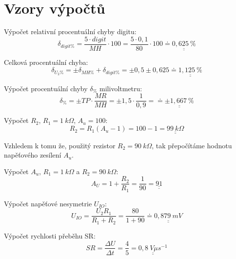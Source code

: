\section*{Vzory výpočtů}
  
  \indent\indent Výpočet relativní procentuální chyby digitu:
  \begin{equation}
    \delta _{digit\%} = \dfrac{5 \cdot digit}{MH} \cdot 100 = \dfrac{5 \cdot 0,1}{80} \cdot 100 \doteq \underline{\underline{0,625~\%}}
    \nonumber
  \end{equation}
  
  Celková procentuální chyba:
  \begin{equation}
    \delta_{U_2\%} = \pm\delta_{MH\%} + \delta_{digit\%} = \pm 0,5 \pm 0,625 \doteq \underline{\underline{1,125~\%}}
    \nonumber
  \end{equation} 
  
  Výpočet procentuální chyby $\delta_\%$ milivoltmetru:
  \begin{equation}
  	\delta _\% = \pm TP \cdot \dfrac{MR}{MH} = \pm 1,5 \cdot \dfrac{1}{0,9} = \doteq \underline{\underline{\pm 1,667~\%}}
    \nonumber
  \end{equation}
  
  Výpočet $R_2$, $R_1 = 1~k\Omega$, $A_u = 100$:
  \begin{equation}
  	R_2 = R_1(A_u - 1) = 100 - 1 = \underline{\underline{99~k\Omega}}
    \nonumber
  \end{equation}
  
  Vzhledem k tomu že, použitý rezistor $R_2 = 90~k\Omega$, tak přepočítáme hodnotu napěťového zesílení $A_u$.
  
  Výpočet $A_u$, $R_1 = 1~k\Omega$ a $R_2 = 90~k\Omega$:
  \begin{equation}
  	A_U = 1 + \dfrac{R_2}{R_1} = \dfrac{1}{90} = \underline{\underline{91}}
    \nonumber
  \end{equation}
  
  Výpočet napěťové nesymetrie $U_{IO}$:
  \begin{equation}
  	U_{IO} = \dfrac{U_2R_1}{R_1+R_2} = \dfrac{80}{1 + 90} \doteq \underline{\underline{0,879~mV}}
    \nonumber
  \end{equation}
  
  Výpočet rychlosti přeběhu SR:
  \begin{equation}
  	SR = \dfrac{\Delta U}{\Delta t} = \dfrac{4}{5} = \underline{\underline{0,8~V\mu s^{-1}}}
    \nonumber
  \end{equation}
  
